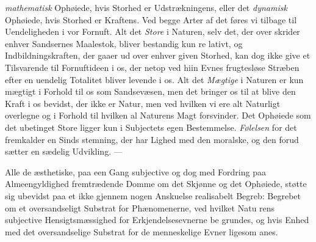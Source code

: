 \documentclass[12pt,a4paper]{book}
\begin{document}
\emph{mathematisk} Ophøiede, hvis Storhed er Udstrækningens,
eller det \emph{dynamisk} Ophøiede, hvis Storhed er Kraftens.
Ved begge Arter af det føres vi tilbage til Uendeligheden i
vor Fornuft. Alt det \emph{Store} i Naturen, selv det, der over\-%
skrider enhver Sandsernes Maalestok, bliver bestandig kun re\-%
lativt, og Indbildningskraften, der gaaer ud over enhver given
Storhed, kan dog ikke give et Tilsvarende til Fornuftideen i
os, der netop ved hiin Evnes frugtesløse Stræben efter en
uendelig Totalitet bliver levende i os. Alt det \emph{Mægtige} i
Naturen er kun mægtigt i Forhold til os som Sandsevæsen,
men det bringer os til at blive den Kraft i os bevidst, der
ikke er Natur, men ved hvilken vi ere alt Naturligt overlegne
og i Forhold til hvilken al Naturens Magt forsvinder. Det
Ophøiede som det ubetinget Store ligger kun i Subjectets
egen Bestemmelse. \emph{Følelsen} for det fremkalder en Sinds\-%
stemning, der har Lighed med den moralske, og den forud\-%
sætter en sædelig Udvikling. ---

Alle de æsthetiske, paa een Gang subjective og dog med
Fordring paa Almeengyldighed fremtrædende Domme om det
Skjønne og det Ophøiede, støtte sig ubevidst paa et ikke
gjennem nogen Anskuelse realisabelt Begreb: Begrebet om et
oversandseligt Substrat for Phænomenerne, ved hvilket Natu\-%
rens subjective Hensigtsmæssighed for Erkjendelsesevnerne be\-%
grundes, og hvis Enhed med det oversandselige Substrat for
de menneskelige Evner ligesom anes.
\end{document}
